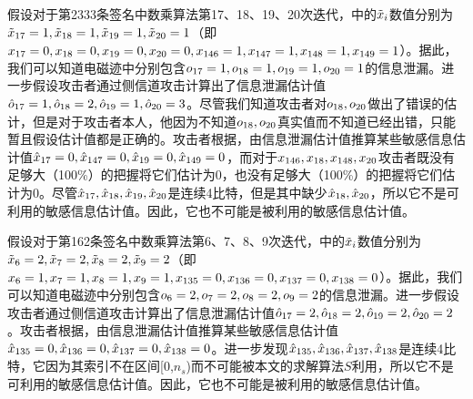 {	\begin{example}
		假设对于第2333条签名中数乘算法第17、18、19、20次迭代，中的$\tilde{x}_i$数值分别为$\tilde{x}_{17}=1,\tilde{x}_{18}=1,\tilde{x}_{19}=1,\tilde{x}_{20}=1$（即$x_{17}=0,x_{18}=0,x_{19}=0,x_{20}=0,x_{146}=1,x_{147}=1,x_{148}=1,x_{149}=1$）。据此，我们可以知道电磁迹中分别包含$o_{17}=1,o_{18}=1,o_{19}=1,o_{20}=1$的信息泄漏。进一步假设攻击者通过侧信道攻击计算出了信息泄漏估计值$\hat{o}_{17}=1,\hat{o}_{18}=2,\hat{o}_{19}=1,\hat{o}_{20}=3$。尽管我们知道攻击者对$o_{18},o_{20}$做出了错误的估计，但是对于攻击者本人，他因为不知道$o_{18},o_{20}$真实值而不知道已经出错，只能暂且假设估计值都是正确的。攻击者根据，由信息泄漏估计值推算某些敏感信息估计值$\hat{x}_{17}=0,\hat{x}_{147}=0,\hat{x}_{19}=0,\hat{x}_{149}=0$，而对于$x_{146},x_{18},x_{148},x_{20}$攻击者既没有足够大（100\%）的把握将它们估计为0，也没有足够大（100\%）的把握将它们估计为0。尽管$\hat{x}_{17},\hat{x}_{18},\hat{x}_{19},\hat{x}_{20}$是连续4比特，但是其中缺少$\hat{x}_{18},\hat{x}_{20}$，所以它不是可利用的敏感信息估计值。因此，它也不可能是被利用的敏感信息估计值。
	\end{example}

	\begin{example}
		假设对于第162条签名中数乘算法第6、7、8、9次迭代，中的$\tilde{x}_i$数值分别为$\tilde{x}_{6}=2,\tilde{x}_{7}=2,\tilde{x}_{8}=2,\tilde{x}_{9}=2$（即$x_{6}=1,x_{7}=1,x_{8}=1,x_{9}=1,x_{135}=0,x_{136}=0,x_{137}=0,x_{138}=0$）。据此，我们可以知道电磁迹中分别包含$o_{6}=2,o_{7}=2,o_{8}=2,o_{9}=2$的信息泄漏。进一步假设攻击者通过侧信道攻击计算出了信息泄漏估计值$\hat{o}_{17}=2,\hat{o}_{18}=2,\hat{o}_{19}=2,\hat{o}_{20}=2$。攻击者根据，由信息泄漏估计值推算某些敏感信息估计值$\hat{x}_{135}=0,\hat{x}_{136}=0,\hat{x}_{137}=0,\hat{x}_{138}=0$。进一步发现$\hat{x}_{135},\hat{x}_{136},\hat{x}_{137},\hat{x}_{138}$是连续4比特，它因为其索引不在区间[0,$n_s$)而不可能被本文的求解算法$S$利用，所以它不是可利用的敏感信息估计值。因此，它也不可能是被利用的敏感信息估计值。
	\end{example}

}
